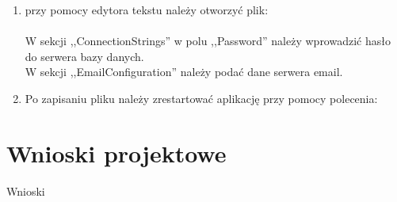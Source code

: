 \documentclass[12pt,a4paper]{article}
\begin{document}
\begin{enumerate}
			\item przy pomocy edytora tekstu należy otworzyć plik:	\\
			\\	
			
			W sekcji ,,ConnectionStrings'' w polu ,,Password'' należy wprowadzić hasło do serwera bazy danych. \\
			W sekcji ,,EmailConfiguration'' należy podać dane serwera email. \\
			\item Po zapisaniu pliku należy zrestartować aplikację przy pomocy polecenia: \\
	\end{enumerate}
	\section{Wnioski projektowe}
		Wnioski
\end{document}
